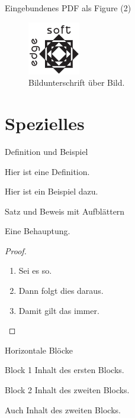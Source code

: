 \documentclass[t, aspectratio=169, handout, ngerman]{beamer}
\begin{document}
	\begin{frame}{Eingebundenes PDF als Figure (2)}
		\begin{figure}
			\caption{Bildunterschrift über Bild.}
			\includegraphics{testlogo}
		\end{figure}
	\end{frame}

	\section{Spezielles}

	\begin{frame}{Definition und Beispiel}
		\begin{definition}
			Hier ist eine Definition.
		\end{definition}
		\begin{example}
			Hier ist ein Beispiel dazu.
		\end{example}
	\end{frame}

	\begin{frame}{Satz und Beweis mit Aufblättern}
		\begin{theorem}
			Eine Behauptung.
		\end{theorem}
		\begin{proof}
			\begin{enumerate}
				\item<1-> Sei es so.
				\item<2-> Dann folgt dies daraus.
				\item<1-> Damit gilt das immer.\qedhere
			\end{enumerate}
		\end{proof}
	\end{frame}

	\begin{frame}{Horizontale Blöcke}
		\begin{block}{Block 1}
			Inhalt des ersten Blocks.
		\end{block}
		\begin{block}{Block 2}
			Inhalt des zweiten Blocks.

			Auch Inhalt des zweiten Blocks.
		\end{block}
	\end{frame}
\end{document}
